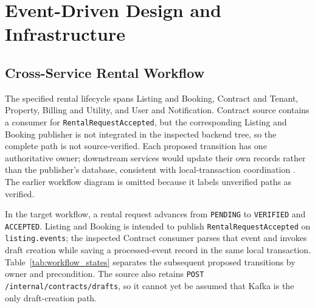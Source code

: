 \section{Event-Driven Design and Infrastructure}\label{sec:events}

\subsection{Cross-Service Rental Workflow}
The specified rental lifecycle spans Listing and Booking, Contract and Tenant, Property, Billing and Utility, and User and Notification. Contract source contains a consumer for \texttt{RentalRequestAccepted}, but the corresponding Listing and Booking publisher is not integrated in the inspected backend tree, so the complete path is not source-verified. Each proposed transition has one authoritative owner; downstream services would update their own records rather than the publisher's database, consistent with local-transaction coordination \cite{richardson2018microservices}. The earlier workflow diagram is omitted because it labels unverified paths as verified.

In the target workflow, a rental request advances from \texttt{PENDING} to \texttt{VERIFIED} and \texttt{ACCEPTED}. Listing and Booking is intended to publish \texttt{RentalRequestAccepted} on \texttt{listing.events}; the inspected Contract consumer parses that event and invokes draft creation while saving a processed-event record in the same local transaction. Table~\ref{tab:workflow_states} separates the subsequent proposed transitions by owner and precondition. The source also retains \texttt{POST /internal/contracts/drafts}, so it cannot yet be assumed that Kafka is the only draft-creation path.


